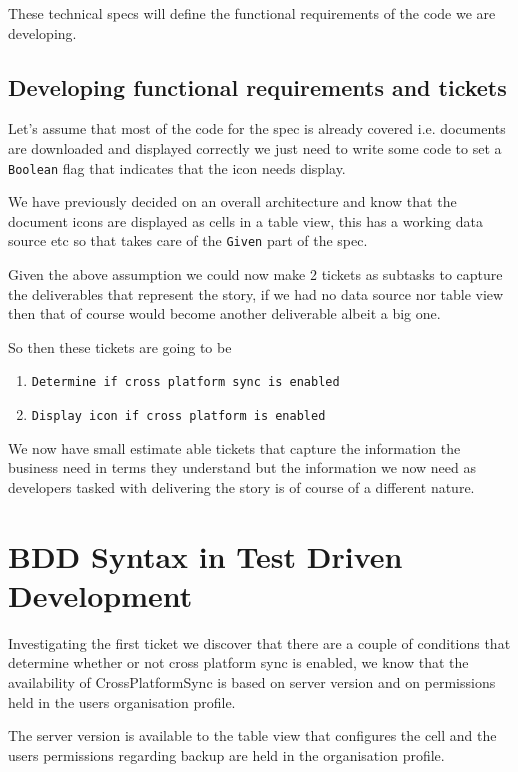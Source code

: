 \documentclass[a4paper, titlepage]{article}
\begin{document}
  These technical specs will define the functional requirements of the code we are
  developing.

  \subsection{Developing functional requirements and tickets}
   Let's assume that most of the code for the spec is already covered i.e. documents
  are downloaded and displayed correctly we just need to write some code
  to set a \texttt{Boolean} flag that indicates that the icon needs display.

  We have previously decided on an overall architecture and know that the document
  icons are displayed as cells in a table view, this has a working data
  source etc so that takes care of the \texttt{Given} part of the
  spec. 

  Given the above assumption we could now make 2 tickets as subtasks to capture the
  deliverables that represent the story, if we had no data source nor
  table view then that of course would become another deliverable
  albeit a big one.
  
  So then these tickets are going to be 

  \begin{enumerate}
    \item{\texttt{Determine if cross platform sync is enabled}}
    \item{\texttt{Display icon if cross platform is enabled}}
  \end{enumerate}
  
  We now have small estimate able tickets that capture the information the
  business need in terms they understand but the information we now need
  as developers tasked with delivering the story is of course of a
  different nature.  

\section{BDD Syntax in Test Driven Development}

  Investigating the first ticket we discover that there are a couple of
  conditions that determine whether or not cross platform sync is
  enabled, we know that the availability of CrossPlatformSync is based
  on server version and on permissions held in the users organisation
  profile.

  The server version is available to the table view that configures the
  cell and the users permissions regarding backup are held in the
  organisation profile.
\end{document}
